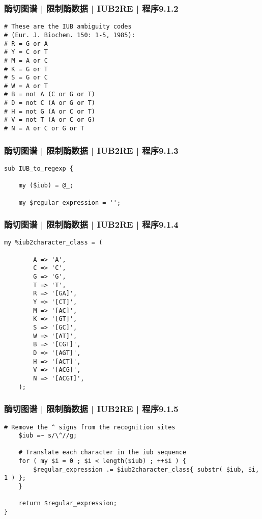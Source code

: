 \begin{frame}[fragile]
  \frametitle{酶切图谱 | 限制酶数据 | IUB2RE | 程序9.1.2}
\begin{lstlisting}[firstnumber=7]
# These are the IUB ambiguity codes
# (Eur. J. Biochem. 150: 1-5, 1985):
# R = G or A
# Y = C or T
# M = A or C
# K = G or T
# S = G or C
# W = A or T
# B = not A (C or G or T)
# D = not C (A or G or T)
# H = not G (A or C or T)
# V = not T (A or C or G)
# N = A or C or G or T
\end{lstlisting}
\end{frame}

\begin{frame}[fragile]
  \frametitle{酶切图谱 | 限制酶数据 | IUB2RE | 程序9.1.3}
\begin{lstlisting}[firstnumber=21]
sub IUB_to_regexp {

    my ($iub) = @_;

    my $regular_expression = '';
\end{lstlisting}
\end{frame}

\begin{frame}[fragile]
  \frametitle{酶切图谱 | 限制酶数据 | IUB2RE | 程序9.1.4}
\begin{lstlisting}[firstnumber=27,basicstyle=\small\tt,numberstyle=\footnotesize]
    my %iub2character_class = (

        A => 'A',
        C => 'C',
        G => 'G',
        T => 'T',
        R => '[GA]',
        Y => '[CT]',
        M => '[AC]',
        K => '[GT]',
        S => '[GC]',
        W => '[AT]',
        B => '[CGT]',
        D => '[AGT]',
        H => '[ACT]',
        V => '[ACG]',
        N => '[ACGT]',
    );
\end{lstlisting}
\end{frame}

\begin{frame}[fragile]
  \frametitle{酶切图谱 | 限制酶数据 | IUB2RE | 程序9.1.5}
\begin{lstlisting}[firstnumber=46]
    # Remove the ^ signs from the recognition sites
    $iub =~ s/\^//g;

    # Translate each character in the iub sequence
    for ( my $i = 0 ; $i < length($iub) ; ++$i ) {
        $regular_expression .= $iub2character_class{ substr( $iub, $i, 1 ) };
    }

    return $regular_expression;
}
\end{lstlisting}
\end{frame}

